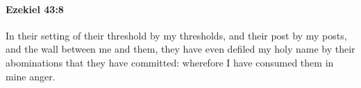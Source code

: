 
		\paragraph{Ezekiel 43:8} %
			\label{EZEKIEL-43-8}

			In their setting of their threshold by my thresholds, and their post by my posts, and the wall between me and them, they have even defiled my holy name by their abominations that they have committed: wherefore I have consumed them in mine anger.


